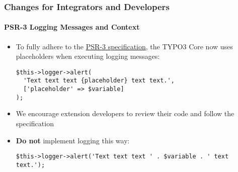 %

\begin{frame}[fragile]
	\frametitle{Changes for Integrators and Developers}
	\framesubtitle{PSR-3 Logging Messages and Context}


	\begin{itemize}
		\item To fully adhere to the \href{https://www.php-fig.org/psr/psr-3/}{PSR-3 specification},
			the TYPO3 Core now uses placeholders when executing logging messages:
\begin{lstlisting}
$this->logger->alert(
  'Text text text {placeholder} text text.',
  ['placeholder' => $variable]
);
\end{lstlisting}

		\item We encourage extension developers to review their code and follow
			the specification
		\item \textbf{Do not} implement logging this way:
\begin{lstlisting}
$this->logger->alert('Text text text ' . $variable . ' text text.');
\end{lstlisting}

	\end{itemize}

\end{frame}

